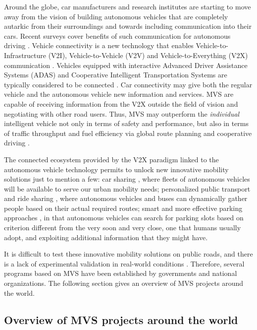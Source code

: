 Around the globe, car manufacturers and research institutes are starting to move away from the vision of building autonomous vehicles that are completely autarkic from their surroundings and towards including communication into their cars. Recent surveys cover benefits of such communication for autonomous driving \cite{wang2018networking} \cite{5G}. Vehicle connectivity is a new technology that enables Vehicle-to-Infrastructure (V2I), Vehicle-to-Vehicle (V2V) and Vehicle-to-Everything (V2X) communication \cite{blum2004threat} \cite{machardy2018v2x}. Vehicles equipped with interactive Advanced Driver Assistance Systems (ADAS) and Cooperative Intelligent Transportation Systems are typically considered to be connected \cite{uhlemann2015introducing}. Car connectivity may give both the regular vehicle and the autonomous vehicle new information and services. MVS are capable of receiving information from the V2X outside the field of vision and negotiating with other road users. Thus, MVS may outperform the \textit{individual} intelligent vehicle not only in terms of safety and performance, but also in terms of traffic throughput and fuel efficiency via global route planning and cooperative driving \cite{eskandarian2019research}.

The connected ecosystem provided by the V2X paradigm linked to the autonomous vehicle technology permits to unlock new innovative mobility solutions just to mention a few: car sharing \cite{goodrich2008human}, where fleets of autonomous vehicles will be available to serve our urban mobility needs; personalized public transport and ride sharing  \cite{OnRecommending}\cite{stiglic2018enhancing}, where autonomous vehicles and buses can dynamically gather people based on their actual required routes; smart and more effective parking approaches \cite{lin2017survey}, in that autonomous vehicles can search for parking slots based on criterion different from the very soon and very close, one that humans usually adopt, and exploiting additional information that they might have. 

It is difficult to test these innovative mobility solutions on public roads, and there is a lack of experimental validation in real-world conditions \cite{guanetti2018control}. Therefore, several programs based on MVS have been established by governments and national organizations. The following section gives an overview of MVS projects around the world. 

\subsection{Overview of MVS projects around the world}\label{sec:MVS_Projects_Overview}



